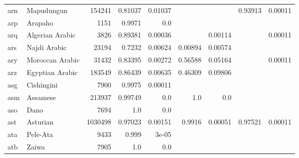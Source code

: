 \documentclass[11pt]{article}
\begin{document}
\begin{table*}[h]
{\begin{tabular}{llrrrrrrr}
arn         & Mapudungun         & 154241         & 0.81037         & 0.01037         &          &          & 0.93913         & 0.00011         \\

arp         & Arapaho         & 1151         & 0.9971         & 0.0         &          &          &          &          \\

arq         & Algerian Arabic         & 3826         & 0.89381         & 0.00036         &          & 0.00114         &          & 0.00011         \\

ars         & Najdi Arabic         & 23194         & 0.7232         & 0.00624         & 0.00894         & 0.00574         &          &          \\

ary         & Moroccan Arabic         & 31432         & 0.83395         & 0.00272         & 0.56588         & 0.05164         &          & 0.00011         \\

arz         & Egyptian Arabic         & 183549         & 0.86439         & 0.00635         & 0.46309         & 0.09806         &          &          \\

asg         & Cishingini         & 7900         & 0.9975         & 0.00011         &          &          &          &          \\

asm         & Assamese         & 213937         & 0.99749         & 0.0         & 1.0         & 0.0         &          &          \\

aso         & Dano         & 7694         & 1.0         & 0.0         &          &          &          &          \\

ast         & Asturian         & 1030498         & 0.97023         & 0.00151         & 0.9916         & 0.00051         & 0.97521         & 0.00011         \\

ata         & Pele-Ata         & 9433         & 0.999         & 3e-05         &          &          &          &          \\

atb         & Zaiwa         & 7905         & 1.0         & 0.0         &          &          &          &          \\


\end{tabular}}
\end{table*}
\end{document}
